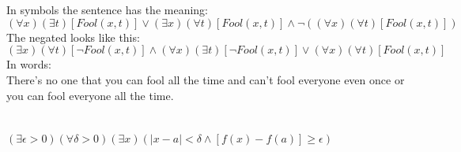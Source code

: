 \documentclass{article}
\begin{document}
\section{}
In symbols the sentence has the meaning:\\
$(\forall x)(\exists t)[Fool(x,t)] \vee (\exists x)(\forall t)[Fool(x,t)] \wedge \neg((\forall x)(\forall t)[Fool(x,t)])$ \\
The negated looks like this:\\
$(\exists x)(\forall t)[\neg Fool(x,t)] \wedge (\forall x)(\exists t)[\neg Fool(x,t)] \vee (\forall x)(\forall t)[Fool(x,t)]$ \\
In words: \\
There's no one that you can fool all the time and can't fool everyone even once or you can fool everyone all the time. \\

\section{}
$(\exists \epsilon > 0)(\forall \delta > 0)(\exists x)(|x -a| < \delta \wedge [f(x) - f(a)] \geq \epsilon)$
\end{document}
